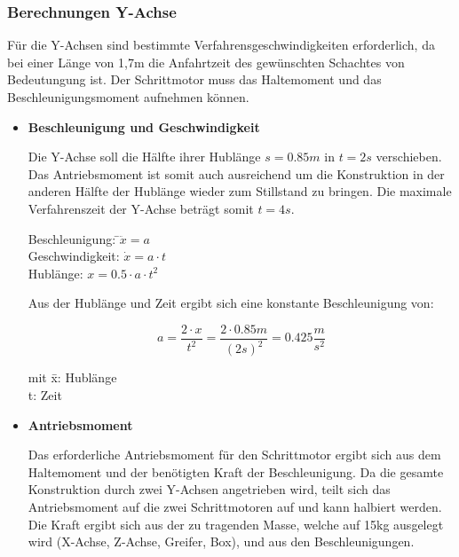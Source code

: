 \subsubsection{Berechnungen Y-Achse}


Für die Y-Achsen sind bestimmte Verfahrensgeschwindigkeiten erforderlich, da bei einer Länge von 1,7m die Anfahrtzeit des 
gewünschten Schachtes von Bedeutungung ist. Der Schrittmotor muss das Haltemoment und das Beschleunigungsmoment aufnehmen können. 

\begin{itemize}

\item \textbf{Beschleunigung und Geschwindigkeit}

Die Y-Achse soll die Hälfte ihrer Hublänge $s=0.85m$ in $t=2s$ verschieben. Das Antriebsmoment ist somit auch ausreichend um die Konstruktion in der anderen Hälfte der Hublänge wieder zum Stillstand zu bringen. Die maximale Verfahrenszeit der Y-Achse beträgt somit $t=4s$.


\begin{tabbing}
Beschleunigung: \qquad \=$\ddot{x}=a$\\
Geschwindigkeit: 							\>$\dot{x}=a\cdot t$\\
Hublänge:												\>$x=0.5\cdot a\cdot t^2$\\
\end{tabbing}

Aus der Hublänge und Zeit ergibt sich eine konstante Beschleunigung von:

\[a=\dfrac{2\cdot x}{t^2}=\dfrac{2\cdot 0.85m}{(2s)^2}=0.425\dfrac{m}{s^2}\]


\begin{tabbing}
mit \=x: Hublänge\\
		\>t: Zeit\\
\end{tabbing}


\item \textbf{Antriebsmoment}


Das erforderliche Antriebsmoment für den Schrittmotor ergibt sich aus dem Haltemoment und der benötigten Kraft der Beschleunigung. Da die gesamte Konstruktion durch zwei Y-Achsen angetrieben wird, teilt sich das Antriebsmoment auf die 
zwei Schrittmotoren auf und kann halbiert werden.\\

Die Kraft ergibt sich aus der zu tragenden Masse, welche auf 15kg ausgelegt wird (X-Achse, Z-Achse, Greifer, Box),
und aus den Beschleunigungen.


\end{itemize}
